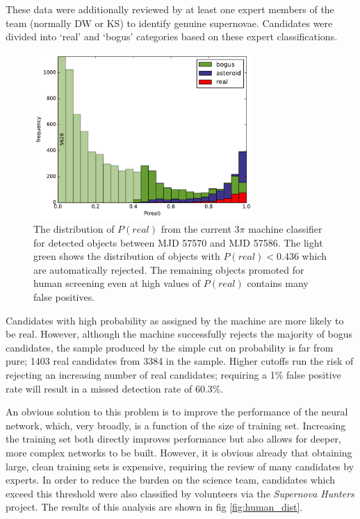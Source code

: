 \documentclass[a4paper,fleqn,usenatbib]{mnras}
\begin{document}
These data were additionally reviewed by at least one expert members of the team (normally DW or KS) to identify genuine supernovae. Candidates were divided into `real' and `bogus' categories based on these expert classifications. 

\begin{figure}
   \includegraphics[width=84mm]{figs/machine_hist.pdf}
   \caption{The distribution of $P(real)$ from the current 3$\pi$ machine classifier 
            for detected objects between MJD 57570 and MJD 57586.  The light green shows the distribution of 
            objects with $P(real) < 0.436$ which are automatically rejected.  The remaining 
            objects promoted for human screening even at high values of $P(real)$ contains
            many false positives.} 
   \label{fig:machine_dist} 
\end{figure}

Candidates with high probability as assigned by the machine are more likely to be real. However, although the machine successfully rejects the majority of bogus candidates, the sample produced by the simple cut on probability is far from pure; 1403 real candidates from 3384 in the sample. Higher cutoffs run the risk of rejecting an increasing number of real candidates; requiring a 1\% false positive rate will result in a missed detection rate of 60.3\%. 

An obvious solution to this problem is to improve the performance of the neural network, which, very broadly, is a function of the size of training set. Increasing the training set both directly improves performance but also allows for deeper, more complex networks to be built. However, it is obvious already that obtaining large, clean training sets is expensive, requiring the review of many candidates by experts. In order to reduce the burden on the science team, candidates which exceed this threshold were also classified by volunteers via the \emph{Supernova Hunters} project. The results of this analysis are shown in fig \ref{fig:human_dist}. 
\end{document}
